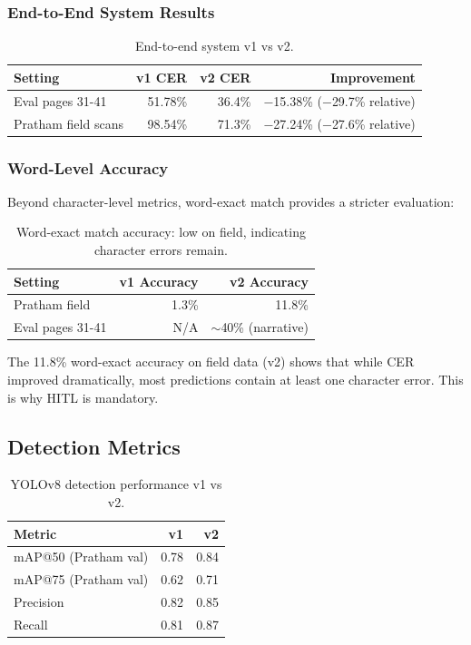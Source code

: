 \documentclass[14pt,a4paper]{article}
\begin{document}
\subsubsection{End-to-End System Results}

\begin{table}[h]
    \centering
    \begin{tabular}{lrrr}
        \toprule
        \textbf{Setting} & \textbf{v1 CER} & \textbf{v2 CER} & \textbf{Improvement} \\
        \midrule
        Eval pages 31-41 & 51.78\% & 36.4\% & $-$15.38\% ($-$29.7\% relative) \\
        Pratham field scans & 98.54\% & 71.3\% & $-$27.24\% ($-$27.6\% relative) \\
        \bottomrule
    \end{tabular}
    \caption{End-to-end system v1 vs v2.}
\end{table}

\subsubsection{Word-Level Accuracy}

Beyond character-level metrics, word-exact match provides a stricter evaluation:

\begin{table}[h]
    \centering
    \begin{tabular}{lrr}
        \toprule
        \textbf{Setting} & \textbf{v1 Accuracy} & \textbf{v2 Accuracy} \\
        \midrule
        Pratham field & 1.3\% & 11.8\% \\
        Eval pages 31-41 & N/A & $\sim$40\% (narrative) \\
        \bottomrule
    \end{tabular}
    \caption{Word-exact match accuracy: low on field, indicating character errors remain.}
\end{table}

The 11.8\% word-exact accuracy on field data (v2) shows that while CER improved dramatically, most predictions contain at least one character error. This is why HITL is mandatory.

\subsection{Detection Metrics}

\begin{table}[h]
    \centering
    \begin{tabular}{lrr}
        \toprule
        \textbf{Metric} & \textbf{v1} & \textbf{v2} \\
        \midrule
        mAP@50 (Pratham val) & 0.78 & 0.84 \\
        mAP@75 (Pratham val) & 0.62 & 0.71 \\
        Precision & 0.82 & 0.85 \\
        Recall & 0.81 & 0.87 \\
        \bottomrule
    \end{tabular}
    \caption{YOLOv8 detection performance v1 vs v2.}
\end{table}
\newpage
\end{document}
